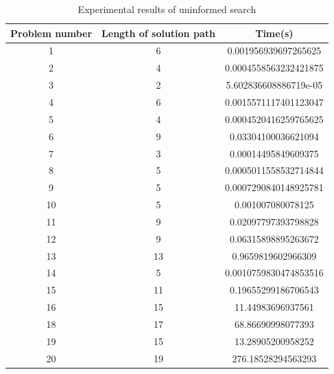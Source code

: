 \documentclass{article}
\begin{document}
\begin{table}[H]
\caption{Experimental results of uninformed search}
    \begin{tabular}{ccc}
    \toprule
    Problem number & Length of solution path & Time(s)               \\
    \midrule
    1         & 6                       & 0.001956939697265625  \\
    2         & 4                       & 0.0004558563232421875 \\
    3         & 2                       & 5.602836608886719e-05 \\
    4         & 6                       & 0.0015571117401123047 \\
    5         & 4                       & 0.0004520416259765625 \\
    6         & 9                       & 0.03304100036621094   \\
    7         & 3                       & 0.00014495849609375   \\
    8         & 5                       & 0.0005011558532714844 \\
    9         & 5                       & 0.0007290840148925781 \\
    10        & 5                       & 0.001007080078125     \\
    11        & 9                       & 0.02097797393798828   \\
    12        & 9                       & 0.06315898895263672   \\
    13        & 13                      & 0.9659819602966309    \\
    14        & 5                       & 0.0010759830474853516 \\
    15        & 11                      & 0.19655299186706543   \\
    16        & 15                      & 11.44983696937561     \\
    18        & 17                      & 68.86690998077393     \\
    19        & 15                      & 13.28905200958252     \\
    20        & 19                      & 276.18528294563293    \\
    \bottomrule
    \end{tabular}
\end{table}
\end{document}
